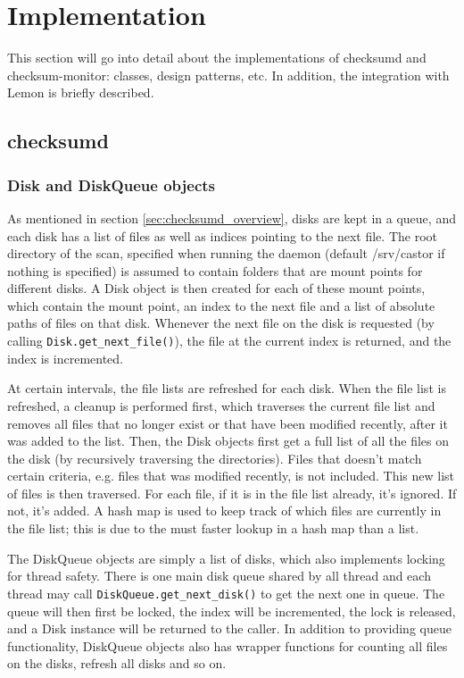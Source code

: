 \section{Implementation}
This section will go into detail about the implementations of checksumd and checksum-monitor: classes, design patterns, etc. In addition, the integration with Lemon is briefly described.

\subsection{checksumd}

\subsubsection{Disk and DiskQueue objects}
As mentioned in section \ref{sec:checksumd_overview}, disks are kept in a queue, and each disk has a list of files as well as indices pointing to the next file. The root directory of the scan, specified when running the daemon (default /srv/castor if nothing is specified) is assumed to contain folders that are mount points for different disks. A Disk object is then created for each of these mount points, which contain the mount point, an index to the next file and a list of absolute paths of files on that disk. Whenever the next file on the disk is requested (by calling {\tt Disk.get\_next\_file()}), the file at the current index is returned, and the index is incremented.

At certain intervals, the file lists are refreshed for each disk. When the file list is refreshed, a cleanup is performed first, which traverses the current file list and removes all files that no longer exist or that have been modified recently, after it was added to the list. Then, the Disk objects first get a full list of all the files on the disk (by recursively traversing the directories). Files that doesn't match certain criteria, e.g. files that was modified recently, is not included. This new list of files is then traversed. For each file, if it is in the file list already, it's ignored. If not, it's added. A hash map is used to keep track of which files are currently in the file list; this is due to the must faster lookup in a hash map than a list.

The DiskQueue objects are simply a list of disks, which also implements locking for thread safety. There is one main disk queue shared by all thread and each thread may call {\tt DiskQueue.get\_next\_disk()} to get the next one in queue. The queue will then first be locked, the index will be incremented, the lock is released, and a Disk instance will be returned to the caller. In addition to providing queue functionality, DiskQueue objects also has wrapper functions for counting all files on the disks, refresh all disks and so on.


